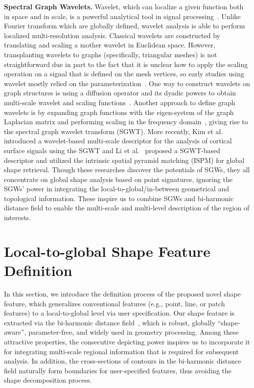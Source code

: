 \textbf{Spectral Graph Wavelets.} Wavelet, which can localize a given
function both in space and in scale, is a powerful analytical tool in
signal processing~\cite{Mallat2008}. Unlike Fourier transform which
are globally defined, wavelet analysis is able to perform localized
multi-resolution analysis. Classical wavelets are constructed by
translating and scaling a mother wavelet in Euclidean space. However,
transplanting wavelets to graphs (specifically, triangular meshes) is
not straightforward due in part to the fact that it is unclear how to
apply the scaling operation on a signal that is defined on the mesh
vertices, so early studies using wavelet mostly relied on the
parameterization~\cite{Werghi:2002,Liu:2007}. One way to construct
wavelets on graph structures is using a diffusion operator and its
dyadic powers to obtain multi-scale wavelet and scaling
functions~\cite{Coifman2006,Hou2013}. Another approach to define
graph wavelets is by expanding graph functions with the eigen-system
of the graph Laplacian matrix and performing scaling in the frequency
domain~\cite{Hammond2011,Hou2012}, giving rise to the spectral
graph wavelet transform (SGWT). More recently, Kim et
al.~\cite{Kim:2012,Kim:2014} introduced a wavelet-based multi-scale
descriptor for the analysis of cortical surface signals using the SGWT
and Li et al.~\cite{Li:2013} proposed a SGWT-based descriptor and
utilized the intrinsic spatial pyramid matching (ISPM) for global
shape retrieval. Though these researches discover the potentials of
SGWs, they all concentrate on global shape analysis based on point
signatures, ignoring the SGWs' power in integrating the
local-to-global/in-between geometrical and topological information.
These inspire us to combine SGWs and bi-harmonic distance field to
enable the multi-scale and multi-level description of the region of
interests.

\section{Local-to-global Shape Feature Definition}
\label{sec:GF}

In this section, we introduce the definition process of the proposed
novel shape feature, which generalizes conventional features (e.g.,
point, line, or patch features) to a local-to-global level via user
specification. Our shape feature is extracted via the bi-harmonic
distance field~\cite{Lipman:2010}, which is robust, globally
``shape-aware'', parameter-free, and widely used in geometry
processing. Among these attractive properties, the consecutive
depicting power inspires us to incorporate it for integrating
multi-scale regional information that is required for subsequent
analysis. In addition, the cross-sections of contours in the
bi-harmonic distance field naturally form boundaries for
user-specified features, thus avoiding the shape decomposition
process.


